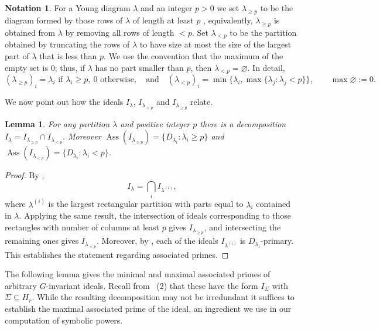 \documentclass[11pt, reqno]{amsart}
\numberwithin{equation}{section}
\newtheorem{lemma}[theorem]{Lemma}
\theoremstyle{definition}
\newtheorem{notation}[theorem]{Notation}
\DeclareMathOperator{\Ass}{Ass}
\renewcommand{\l}{\lambda}
\begin{document}
\begin{notation}\label{def: <v}
			For a Young diagram $\l$ and an integer $p>0$  we set
					$\lambda_{\geqslant p}$ to be the diagram formed by those rows of $\lambda$ of length at least $p$	, equivalently, $\lambda_{\geqslant p}$ is obtained from $\l$ by removing all rows of length $<p$.  Set $\lambda_{<p}$ to be the partition obtained by truncating the rows of $\l$ to have size at most the size of the largest part of $\l$ that is less than $p$. We use the convention that the maximum of the empty set is $0$; thus, if $\lambda$ has no part smaller than $p$, then $\lambda_{<p}=\varnothing$. In detail,
					\[
					(\l_{\geq p})_i= \l_i \text{ if } \l_i\geq p, \ 0 \text{ otherwise},  \quad \text{and} \quad
					(\l_{<p})_i=\min\{\l_i, \max\{\l_j: \l_j<p\}\},
					\qquad \max\varnothing:=0.
					\]
	\end{notation}

	We now point out how the ideals $I_\l$, $I_{\l_{<p}}$ and $I_{\l_{\geqslant p}}$ relate.
\begin{lemma}\label{lem: <v}
For any partition $\lambda$ and positive integer $p$ there is a decomposition
$
I_\lambda=I_{\lambda_{\ge p}}\cap I_{\lambda_{<p}}.
$
Moreover $\Ass (I_{\lambda_{\ge p}})=\{D_{\l_i}: \l_i\geq p \}$ and $\Ass (I_{\lambda_{< p}})=\{D_{\l_i}: \l_i < p\}$.
\end{lemma}
\begin{proof}
By \cite[Cor.~5.4]{deconcini1980young},
\begin{equation}\label{eq: ass Is}
I_\lambda=\bigcap_i I_{\lambda^{(i)}},
\end{equation}
where $\lambda^{(i)}$ is the largest rectangular partition with parts equal to $\lambda_i$ contained in $\lambda$.
Applying the same result, the intersection of ideals corresponding to those rectangles with number of columns at least $p$ gives $I_{\lambda_{\ge p}}$, and intersecting the remaining ones gives $I_{\lambda_{<p}}$. Moreover, by \cite[Cor.~5.3]{deconcini1980young}, each of the ideals  $I_{\lambda^{(i)}}$ is $D_{\l_i}$-primary. This establishes the statement regarding associated primes.
\end{proof}

The following lemma gives the minimal and maximal associated primes of arbitrary $G$-invariant ideals. Recall from ~(2) that these have the form $I_\Sigma$ with $\Sigma\subseteq H_r$. While the resulting decomposition may not be irredundant it suffices to establish the maximal associated prime of the ideal, an ingredient we use in our computation of symbolic powers.
\end{document}
